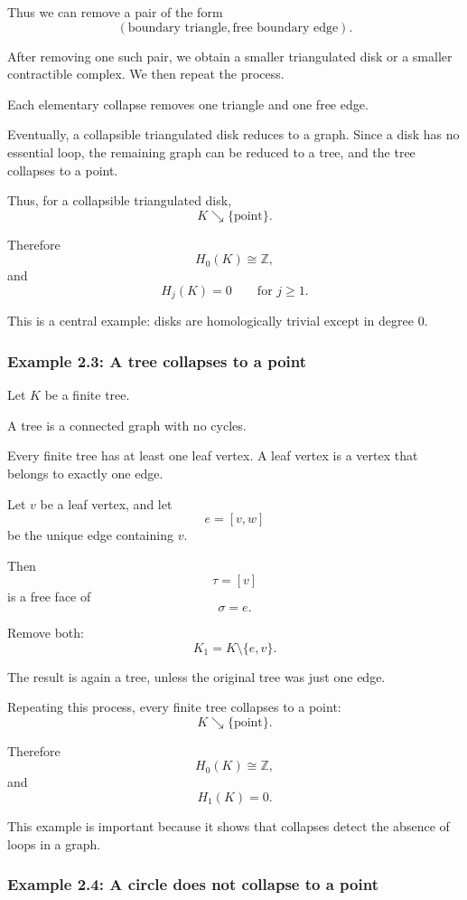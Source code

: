 \documentclass[12pt,a4paper]{article}
\theoremstyle{notespace}
\begin{document}
Thus we can remove a pair of the form
\[
(\text{boundary triangle},\text{free boundary edge}).
\]

After removing one such pair, we obtain a smaller triangulated disk or a smaller contractible complex. We then repeat the process.

Each elementary collapse removes one triangle and one free edge.

Eventually, a collapsible triangulated disk reduces to a graph. Since a disk has no essential loop, the remaining graph can be reduced to a tree, and the tree collapses to a point.

Thus, for a collapsible triangulated disk,
\[
K\searrow \{\text{point}\}.
\]

Therefore
\[
H_0(K)\cong \mathbb Z,
\]
and
\[
H_j(K)=0
\qquad
\text{for }j\geq 1.
\]

This is a central example: disks are homologically trivial except in degree \(0\).

\subsubsection{Example 2.3: A tree collapses to a point}

Let \(K\) be a finite tree.

A tree is a connected graph with no cycles.

Every finite tree has at least one leaf vertex. A leaf vertex is a vertex that belongs to exactly one edge.

Let \(v\) be a leaf vertex, and let
\[
e=[v,w]
\]
be the unique edge containing \(v\).

Then
\[
\tau=[v]
\]
is a free face of
\[
\sigma=e.
\]

Remove both:
\[
K_1=K\setminus\{e,v\}.
\]

The result is again a tree, unless the original tree was just one edge.

Repeating this process, every finite tree collapses to a point:
\[
K\searrow \{\text{point}\}.
\]

Therefore
\[
H_0(K)\cong \mathbb Z,
\]
and
\[
H_1(K)=0.
\]

This example is important because it shows that collapses detect the absence of loops in a graph.

\subsubsection{Example 2.4: A circle does not collapse to a point}
\end{document}
